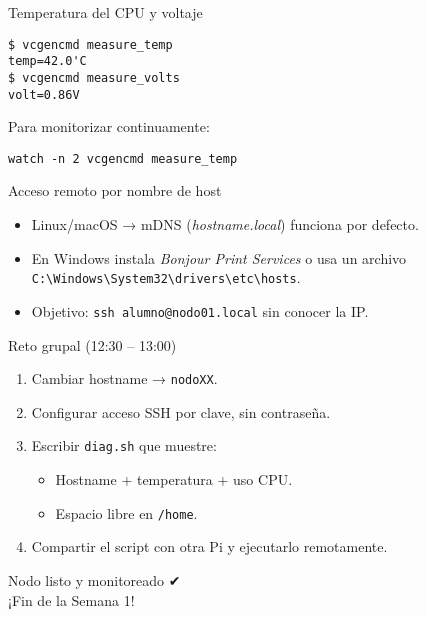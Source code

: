 \documentclass[aspectratio=169, professionalfonts]{beamer}
\begin{document}
\begin{frame}[fragile]{Temperatura del CPU y voltaje}
\begin{verbatim}
$ vcgencmd measure_temp
temp=42.0'C
$ vcgencmd measure_volts
volt=0.86V
\end{verbatim}
Para monitorizar continuamente:  
\begin{verbatim}
watch -n 2 vcgencmd measure_temp
\end{verbatim}
\end{frame}

\begin{frame}{Acceso remoto por nombre de host}
\begin{itemize}
  \item Linux/macOS → mDNS (\textit{hostname.local}) funciona por defecto.  
  \item En Windows instala \emph{Bonjour Print Services} o usa un archivo \texttt{C:\textbackslash Windows\textbackslash System32\textbackslash drivers\textbackslash etc\textbackslash hosts}.  
  \item Objetivo: \texttt{ssh alumno@nodo01.local} sin conocer la IP.  
\end{itemize}
\end{frame}

\begin{frame}[fragile]{Reto grupal (12:30 – 13:00)}
\begin{enumerate}
  \item Cambiar hostname → \texttt{nodoXX}.  
  \item Configurar acceso SSH por clave, sin contraseña.  
  \item Escribir \texttt{diag.sh} que muestre:
    \begin{itemize}
      \item Hostname + temperatura + uso CPU.  
      \item Espacio libre en \texttt{/home}.  
    \end{itemize}
  \item Compartir el script con otra Pi y ejecutarlo remotamente.  
\end{enumerate}
\end{frame}

\begin{frame}[fragile]
Nodo listo y monitoreado ✔\\
\small ¡Fin de la Semana 1!
\end{frame}
\end{document}
